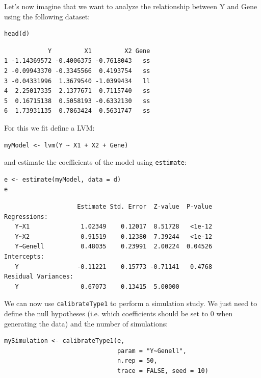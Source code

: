 \documentclass[12pt]{article}
\begin{document}
Let's now imagine that we want to analyze the relationship between
Y and Gene using the following dataset:
\lstset{language=r,label= ,caption= ,captionpos=b,numbers=none}
\begin{lstlisting}
head(d)
\end{lstlisting}

\begin{verbatim}
            Y         X1         X2 Gene
1 -1.14369572 -0.4006375 -0.7618043   ss
2 -0.09943370 -0.3345566  0.4193754   ss
3 -0.04331996  1.3679540 -1.0399434   ll
4  2.25017335  2.1377671  0.7115740   ss
5  0.16715138  0.5058193 -0.6332130   ss
6  1.73931135  0.7863424  0.5631747   ss
\end{verbatim}


For this we fit define a LVM:
\lstset{language=r,label= ,caption= ,captionpos=b,numbers=none}
\begin{lstlisting}
myModel <- lvm(Y ~ X1 + X2 + Gene)
\end{lstlisting}

and estimate the coefficients of the model using \texttt{estimate}:
\lstset{language=r,label= ,caption= ,captionpos=b,numbers=none}
\begin{lstlisting}
e <- estimate(myModel, data = d)
e
\end{lstlisting}

\begin{verbatim}
                    Estimate Std. Error  Z-value  P-value
Regressions:                                             
   Y~X1              1.02349    0.12017  8.51728   <1e-12
   Y~X2              0.91519    0.12380  7.39244   <1e-12
   Y~Genell          0.48035    0.23991  2.00224  0.04526
Intercepts:                                              
   Y                -0.11221    0.15773 -0.71141   0.4768
Residual Variances:                                      
   Y                 0.67073    0.13415  5.00000
\end{verbatim}


We can now use \texttt{calibrateType1} to perform a simulation study. We just
need to define the null hypotheses (i.e. which coefficients should be
set to 0 when generating the data) and the number of simulations:
\lstset{language=r,label= ,caption= ,captionpos=b,numbers=none}
\begin{lstlisting}
mySimulation <- calibrateType1(e, 
                               param = "Y~Genell",
                               n.rep = 50, 
                               trace = FALSE, seed = 10)
\end{lstlisting}
\end{document}
